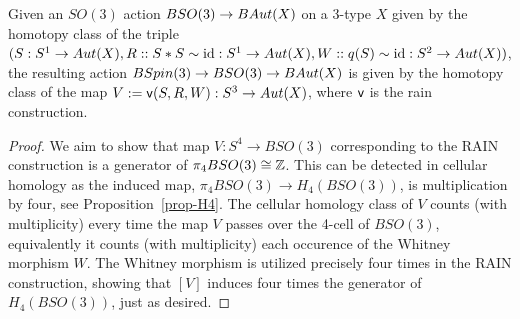 \documentclass{amsart}
\begin{document}
%


\begin{prop}
Given an $SO(3)$ action $BSO(3) \rightarrow BAut(X)$ on a 3-type $X$ given by the homotopy class of the triple $(S: S^1 \to Aut(X),R:: S \ast S \sim \mathrm{id} : S^1 \to Aut(X),W:: q(S) \sim \mathrm{id} : S^2 \to Aut(X))$, the resulting action $BSpin(3) \rightarrow BSO(3) \rightarrow BAut(X)$ is given by the homotopy class of the map $V := \mathsf{v}(S,R,W) : S^3 \rightarrow Aut(X)$, where $\mathsf{v}$ is the rain construction.
\end{prop}


\begin{proof}
	We aim to show that map $V:S^4 \to BSO(3)$ corresponding to the RAIN construction is a generator of $\pi_4BSO(3) \cong \mathbb Z$. This can be detected in cellular homology as the induced map, $\pi_4BSO(3) \to H_4(BSO(3))$, is multiplication by four, see Proposition~\ref{prop-H4}. The cellular homology class of $V$ counts (with multiplicity) every time the map $V$ passes over the 4-cell of $BSO(3)$, equivalently it counts
	(with multiplicity) each occurence of the Whitney morphism $W$. The Whitney morphism is utilized precisely four times in the RAIN construction, showing that $[V]$ induces four times the generator of $H_4(BSO(3))$, just as desired. 
\end{proof}
\end{document}
